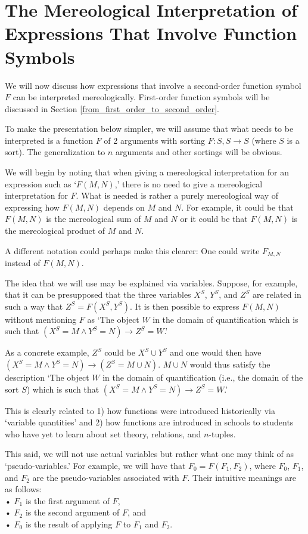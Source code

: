 \documentclass[12pt]{book}
\begin{document}
\section{The Mereological Interpretation of Expressions That Involve Function Symbols} \label{function_application}
We will now discuss how expressions that involve a second-order function symbol $F$ can be interpreted mereologically. First-order function symbols will be discussed in Section \ref{from_first_order_to_second_order}.

To make the presentation below simpler, we will assume that what needs to be interpreted is a function $F$ of 2 arguments with sorting $F : S, S \rightarrow S$ (where $S$ is a sort). The generalization to $n$ arguments and other sortings will be obvious.

We will begin by noting that when giving a mereological interpretation for an expression such as ‘$F(M, N)$,’ there is no need to give a mereological interpretation for $F$. What is needed is rather a purely mereological way of expressing how $F(M, N)$ depends on $M$ and $N$. For example, it could be that $F(M, N)$ is the mereological sum of $M$ and $N$ or it could be that $F(M, N)$ is the mereological product of $M$ and $N$.

A different notation could perhaps make this clearer: One could write $F_{M, N}$ instead of $F(M, N)$.

The idea that we will use may be explained via variables. Suppose, for example, that it can be presupposed that the three variables $X^S$, $Y^S$, and $Z^S$ are related in such a way that $Z^S = F(X^S, Y^S)$. It is then possible to express $F(M, N)$ without mentioning $F$ as `The object $W$ in the domain of quantification which is such that $(X^S = M \wedge Y^S = N) \rightarrow Z^S = W$.’

As a concrete example, $Z^S$ could be $X^S \cup Y^S$ and one would then have $(X^S = M \wedge Y^S = N) \rightarrow (Z^S = M \cup N)$. $M \cup N$ would thus satisfy the description `The object $W$ in the domain of quantification (i.e., the domain of the sort $S$) which is such that $(X^S = M \wedge Y^S = N) \rightarrow Z^S = W$.’

This is clearly related to 1) how functions were introduced historically via `variable quantities’ and 2) how functions are introduced in schools to students who have yet to learn about set theory, relations, and $n$-tuples.

This said, we will not use actual variables but rather what one may think of as `pseudo-variables.’ For example, we will have that $F_0 = F(F_1, F_2)$, where $F_0$, $F_1$, and $F_2$ are the pseudo-variables associated with $F$. Their intuitive meanings are as follows:\\
•	$F_1$ is the first argument of $F$,\\
•	$F_2$ is the second argument of $F$, and \\
•	$F_0$ is the result of applying $F$ to $F_1$ and $F_2$.
\end{document}
